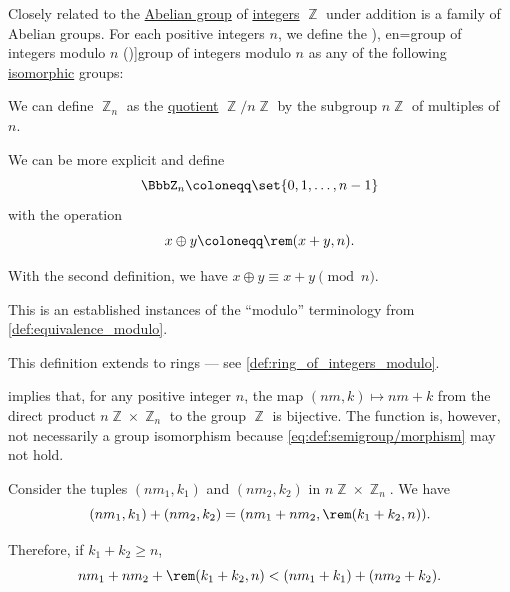 \begin{definition}\label{def:group_of_integers_modulo}
  Closely related to the \hyperref[def:abelian_group]{Abelian group} of \hyperref[def:integers]{integers} \( \BbbZ \) under addition is a family of Abelian groups. For each positive integers \( n \), we define the \term[ru=группа въчетов по модулю \( n \) (\cite[128]{БелоусовТкачёв2004ДискретнаяМатематика}), en=group of integers modulo \( n \) (\cite[def. 1.5]{LidlNiederreiter1997FiniteFields})]{group of integers modulo} \( n \) as any of the following \hyperref[def:group/morphism]{isomorphic} groups:

  \begin{thmenum}
     We can define \( \BbbZ_n \) as the \hyperref[def:group/quotient]{quotient} \( \BbbZ / n \BbbZ \) by the subgroup \( n \BbbZ \) of multiples of \( n \).

    \mimprovised We can be more explicit and define
    \begin{equation*}
      \BbbZ_n \coloneqq \set{ 0, 1, \ldots, n - 1 }
    \end{equation*}
    with the operation
    \begin{equation*}
      x \oplus y \coloneqq \rem(x + y, n).
    \end{equation*}
  \end{thmenum}
\end{definition}
\begin{comments}
  \item With the second definition, we have \( x \oplus y \equiv x + y \pmod n \).
  \item This is an established instances of the \enquote{modulo} terminology from \cref{def:equivalence_modulo}.
  \item This definition extends to rings --- see \cref{def:ring_of_integers_modulo}.
\end{comments}

\begin{example}\label{ex:thm:lagranges_subgroup_theorem/direct_product_zn}
   implies that, for any positive integer \( n \), the map \( (nm, k) \mapsto nm + k \) from the direct product \( n \BbbZ \times \BbbZ_n \) to the group \( \BbbZ \) is bijective. The function is, however, not necessarily a group isomorphism because \eqref{eq:def:semigroup/morphism} may not hold.

  Consider the tuples \( (nm_1, k_1) \) and \( (nm_2, k_2) \)  in \( n \BbbZ \times \BbbZ_n \). We have
  \begin{equation*}
    (nm_1, k_1) + (nm_2, k_2) = (nm_1 + nm_2, \rem(k_1 + k_2, n)).
  \end{equation*}

  Therefore, if \( k_1 + k_2 \geq n \),
  \begin{equation*}
    nm_1 + nm_2 + \rem(k_1 + k_2, n) < (nm_1 + k_1) + (nm_2 + k_2).
  \end{equation*}
\end{example}

